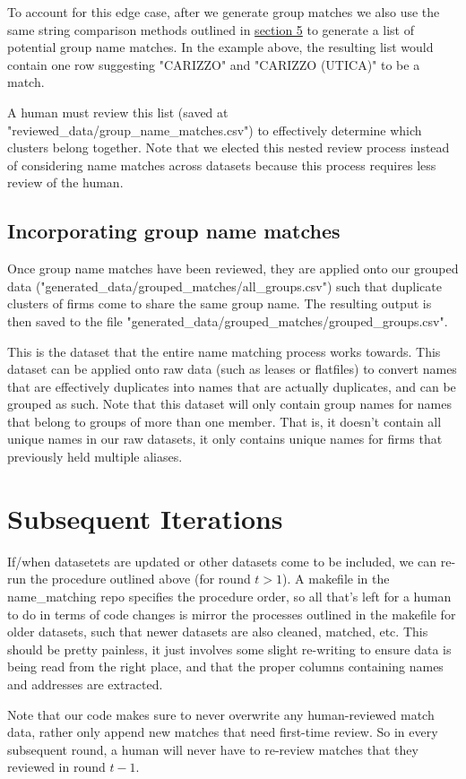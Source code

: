 \documentclass{article}
\begin{document}
To account for this edge case, after we generate group matches we also use the same string comparison methods outlined in \hyperref[sec:matching]{section 5} to generate a list of potential group name matches. In the example above, the resulting list would contain one row suggesting "CARIZZO" and "CARIZZO (UTICA)" to be a match. 

A human must review this list (saved at "reviewed\_data/group\_name\_matches.csv") to effectively determine which clusters belong together. Note that we elected this nested review process instead of considering name matches across datasets because this process requires less review of the human. 

\subsection{Incorporating group name matches}

Once group name matches have been reviewed, they are applied onto our grouped data ("generated\_data/grouped\_matches/all\_groups.csv") such that duplicate clusters of firms come to share the same group name. The resulting output is then saved to the file "generated\_data/grouped\_matches/grouped\_groups.csv". 

This is the dataset that the entire name matching process works towards. This dataset can be applied onto raw data (such as leases or flatfiles) to convert names that are effectively duplicates into names that are actually duplicates, and can be grouped as such. Note that this dataset will only contain group names for names that belong to groups of more than one member. That is, it doesn't contain all unique names in our raw datasets, it only contains unique names for firms that previously held multiple aliases.  

\section{Subsequent Iterations}
If/when datasetets are updated or other datasets come to be included, we can re-run the procedure outlined above (for round $t > 1$). A makefile in the name\_matching repo specifies the procedure order, so all that's left for a human to do in terms of code changes is mirror the processes outlined in the makefile for older datasets, such that newer datasets are also cleaned, matched, etc. This should be pretty painless, it just involves some slight re-writing to ensure data is being read from the right place, and that the proper columns containing names and addresses are extracted. 

Note that our code makes sure to never overwrite any human-reviewed match data, rather only append new matches that need first-time review. So in every subsequent round, a human will never have to re-review matches that they reviewed in round $t - 1$.  
\end{document}
